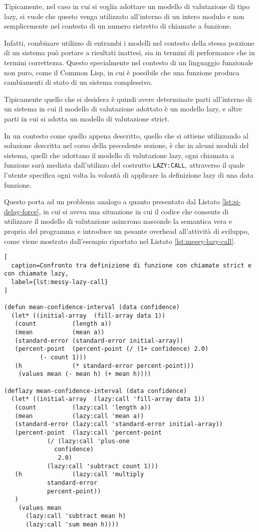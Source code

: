 Tipicamente, nel caso in cui si voglia adottare un modello di valutazione di
tipo lazy, si vuole che questo venga utilizzato all'interno di un intero modulo
e non semplicemente nel contesto di un numero ristretto di chiamate a funzione.

Infatti, combinare utilizzo di entrambi i modelli nel contesto della stessa
porzione di un sistema può portare a risultati inattesi, sia in termini di
performance che in termini correttezza. Questo specialmente nel contesto di un
linguaggio funzionale non puro, come il Common Lisp, in cui è possibile che una
funzione produca cambiamenti di stato di un sistema complessivo.

Tipicamente quello che si desidera è quindi avere determinate parti all'interno
di un sistema in cui il modello di valutazione adottato è un modello lazy, e
altre parti in cui si adotta un modello di valutazione strict.

In un contesto come quello appena descritto, quello che si ottiene utilizzando
al soluzione descritta nel corso della precedente sezione, è che in alcuni
moduli del sistema, quelli che adottano il modello di valutazione lazy, ogni
chiamata a funzione sarà mediata dall'utilizzo del costrutto \texttt{LAZY:CALL},
attraverso il quale l'utente specifica ogni volta la volontà di applicare la
definizione lazy di una data funzione.

Questo porta ad un problema analogo a quanto presentato dal Listato
\ref{lst:si-delay-force}, in cui si aveva una situazione in cui il codice che
consente di utilizzare il modello di valutazione asincrono nasconde la semantica
vera e propria del programma e introduce un pesante overhead all'attività di
sviluppo, come viene mostrato dall'esempio riportato nel Listato
\ref{lst:messy-lazy-call}.

\begin{lstlisting}[
  caption=Confronto tra definizione di funzione con chiamate strict e con chiamate lazy,
  label={lst:messy-lazy-call}
]

(defun mean-confidence-interval (data confidence)
  (let* ((initial-array  (fill-array data 1))
   (count          (length a))
   (mean           (mean a))
   (standard-error (standard-error initial-array))
   (percent-point  (percent-point (/ (1+ confidence) 2.0)
          (- count 1)))
   (h              (* standard-error percent-point)))
    (values mean (- mean h) (+ mean h))))

(deflazy mean-confidence-interval (data confidence)
  (let* ((initial-array  (lazy:call 'fill-array data 1))
   (count          (lazy:call 'length a))
   (mean           (lazy:call 'mean a))
   (standard-error (lazy:call 'standard-error initial-array))
   (percent-point  (lazy:call 'percent-point
            (/ (lazy:call 'plus-one
              confidence)
               2.0)
            (lazy:call 'subtract count 1)))
   (h              (lazy:call 'multiply
            standard-error
            percent-point))
   )
    (values mean
      (lazy:call 'subtract mean h)
      (lazy:call 'sum mean h))))

\end{lstlisting}

